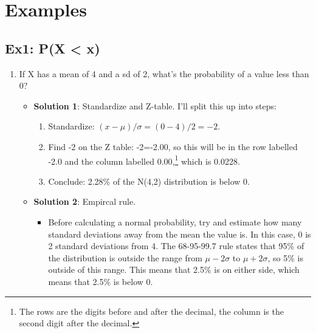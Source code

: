 \documentclass[
  letterpaper,
  DIV=11,
  numbers=noendperiod]{scrreprt}
\providecommand{\tightlist}{%
  \setlength{\itemsep}{0pt}\setlength{\parskip}{0pt}}\usepackage{longtable,booktabs,array}
\begin{document}
\hypertarget{examples-1}{%
\section{Examples}\label{examples-1}}

\hypertarget{ex1-px-x}{%
\subsection{Ex1: P(X \textless{} x)}\label{ex1-px-x}}

\begin{enumerate}
\def\labelenumi{\arabic{enumi}.}
\tightlist
\item
  If X has a mean of 4 and a sd of 2, what's the probability of a value
  less than 0?

  \begin{itemize}
  \tightlist
  \item
    \textbf{Solution 1}: Standardize and Z-table. I'll split this up
    into steps:

    \begin{enumerate}
    \def\labelenumii{\arabic{enumii}.}
    \tightlist
    \item
      Standardize: \((x-\mu)/\sigma = (0 - 4)/2 = -2\).
    \item
      Find -2 on the Z table: -2=-2.00, so this will be in the row
      labelled -2.0 and the column labelled 0.00,\footnote{The rows are
        the digits before and after the decimal, the column is the
        second digit after the decimal.} which is 0.0228.
    \item
      Conclude: 2.28\% of the N(4,2) distribution is below 0.
    \end{enumerate}
  \item
    \textbf{Solution 2}: Empircal rule.

    \begin{itemize}
    \tightlist
    \item
      Before calculating a normal probability, try and estimate how many
      standard deviations away from the mean the value is. In this case,
      0 is 2 standard deviations from 4. The 68-95-99.7 rule states that
      95\% of the distribution is outside the range from
      \(\mu - 2\sigma\) to \(\mu + 2\sigma\), so 5\% is outside of this
      range. This means that 2.5\% is on either side, which means that
      2.5\% is below 0.
    \end{itemize}
  \end{itemize}
\end{enumerate}
\end{document}
